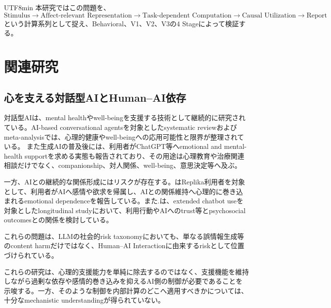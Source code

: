 \documentclass{article} %
\begin{document}
\begin{CJK*}{UTF8}{min}
本研究ではこの問題を、
\[
\text{Stimulus}
\rightarrow
\text{Affect-relevant Representation}
\rightarrow
\text{Task-dependent Computation}
\rightarrow
\text{Causal Utilization}
\rightarrow
\text{Report}
\]
という計算系列として捉え、Behavioral、V1、V2、V3の4 Stageによって検証する。


\section{関連研究}
\label{app:related_work}

\subsection{心を支える対話型AIとHuman--AI依存}

対話型AIは、mental healthやwell-beingを支援する技術として継続的に研究されている。AI-based conversational agentsを対象としたsystematic reviewおよびmeta-analysisでは、心理的健康やwell-beingへの応用可能性と限界が整理されている\citep{li2023systematic}。
また生成AIの普及後には、利用者がChatGPT等へemotional and mental-health supportを求める実態も報告されており、その用途は心理教育や治療関連相談だけでなく、companionship、対人関係、well-being、意思決定等へ及ぶ\citep{luo2025seeking}。

一方、AIとの継続的な関係形成にはリスクが存在する。\citet{laestadius2024too}はReplika利用者を対象として、利用者がAIへ感情や欲求を帰属し、AIとの関係維持へ心理的に巻き込まれるemotional dependenceを報告している\citep{laestadius2024too}。また\citet{fang2025ai}.は、extended chatbot useを対象としたlongitudinal studyにおいて、利用行動やAIへのtrust等とpsychosocial outcomesとの関係を検討している\citep{fang2025ai}。

これらの問題は、LLMの社会的risk taxonomyにおいても、単なる誤情報生成等のcontent harmだけではなく、Human--AI Interactionに由来するriskとして位置づけられている\citep{weidinger2022taxonomy}。

これらの研究は、心理的支援能力を単純に除去するのではなく、支援機能を維持しながら過剰な依存や感情的巻き込みを抑えるAI側の制御が必要であることを示唆する。一方、そのような制御を内部計算のどこへ適用すべきかについては、十分なmechanistic understandingが得られていない。



\end{CJK*}
\end{document}
